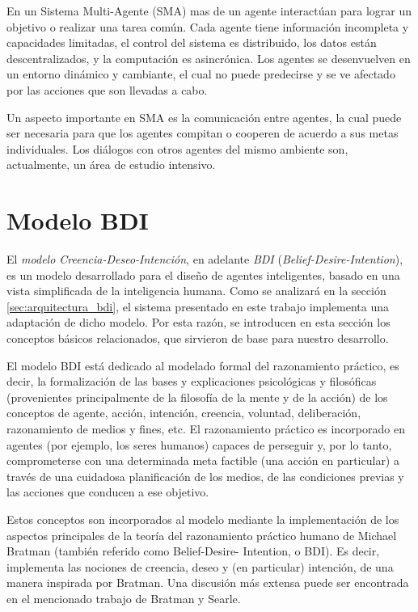  En un Sistema Multi-Agente (SMA) mas de un agente interactúan para
 lograr un objetivo o realizar una tarea común.
 Cada agente tiene información incompleta y capacidades limitadas, el
 control del sistema es distribuido, los datos están descentralizados,
 y la computación es asincrónica.
 Los agentes se desenvuelven en un entorno dinámico y cambiante, el
 cual no puede predecirse y se ve afectado por las acciones que son
 llevadas a cabo.
 
 Un aspecto importante en SMA es la comunicación entre agentes, la cual
 puede ser necesaria para que los agentes compitan o cooperen de
 acuerdo a sus metas individuales. 
 Los diálogos con otros agentes del mismo ambiente son, actualmente, un
 área de estudio intensivo.

\section{Modelo BDI}
 \label{sec:modelo_bdi}
 
 El \textit{modelo Creencia-Deseo-Intención}, en adelante \textit{BDI}
 (\textit{Belief-Desire-Intention}), es un modelo desarrollado para el
 diseño de agentes inteligentes, basado en una vista simplificada de la
 inteligencia humana.
 Como se analizará en la sección \ref{sec:arquitectura_bdi}, el sistema
 presentado en este trabajo implementa una  adaptación de dicho modelo.
 Por esta razón, se introducen en esta sección los  conceptos básicos
 relacionados, que sirvieron de base para nuestro desarrollo.
 
 El modelo BDI está dedicado al modelado formal del razonamiento
 práctico, es  decir, la formalización de las bases y explicaciones
 psicológicas y filosóficas  (provenientes principalmente de la
 filosofía de la mente y de la acción) de los  conceptos de agente,
 acción, intención, creencia, voluntad, deliberación,  razonamiento de
 medios y fines, etc.
 El razonamiento práctico es incorporado  en agentes (por ejemplo, los
 seres humanos) capaces de perseguir y, por lo tanto,  comprometerse
 con una determinada meta factible (una acción en particular)  a través
 de una cuidadosa planificación de los medios, de las condiciones
 previas  y las acciones que conducen a ese objetivo.

 Estos conceptos son incorporados al modelo mediante la implementación
 de los  aspectos principales de la teoría del razonamiento práctico
 humano de Michael Bratman (también referido como Belief-Desire-
 Intention, o BDI).
 Es decir, implementa  las nociones de creencia, deseo y (en
 particular) intención, de una manera inspirada  por Bratman.
 Una discusión más extensa puede ser encontrada en el mencionado
 trabajo de Bratman\cite{brat99} y Searle\cite{searle1985}.
 
